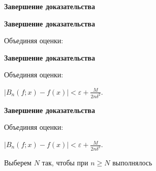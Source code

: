 \documentclass[11pt]{article}
\begin{document}
\newpage

\begin{center}
{\color{notaeYELLOW}\bfseries\fontsize{44}{52}\selectfont Завершение доказательства}
\end{center}
\vspace*{\fill}
\begin{center}
\fontsize{36}{43}\selectfont
\end{center}
\vspace*{\fill}

\newpage

\begin{center}
{\color{notaeYELLOW}\bfseries\fontsize{44}{52}\selectfont Завершение доказательства}
\end{center}
\vspace*{\fill}
\begin{center}
\fontsize{36}{43}\selectfont
Объединяя оценки:\par\vspace{0.4in}
\end{center}
\vspace*{\fill}

\newpage

\begin{center}
{\color{notaeYELLOW}\bfseries\fontsize{44}{52}\selectfont Завершение доказательства}
\end{center}
\vspace*{\fill}
\begin{center}
\fontsize{36}{43}\selectfont
Объединяя оценки:\par\vspace{0.4in}
$\left| B_n(f;x) - f(x) \right| < \varepsilon + \frac{M}{2n\delta^2}.$\par\vspace{0.4in}
\end{center}
\vspace*{\fill}

\newpage

\begin{center}
{\color{notaeYELLOW}\bfseries\fontsize{44}{52}\selectfont Завершение доказательства}
\end{center}
\vspace*{\fill}
\begin{center}
\fontsize{36}{43}\selectfont
Объединяя оценки:\par\vspace{0.4in}
$\left| B_n(f;x) - f(x) \right| < \varepsilon + \frac{M}{2n\delta^2}.$\par\vspace{0.4in}
Выберем $N$ так, чтобы при $n \geqslant N$ выполнялось\par\vspace{0.4in}
\end{center}
\vspace*{\fill}
\end{document}
